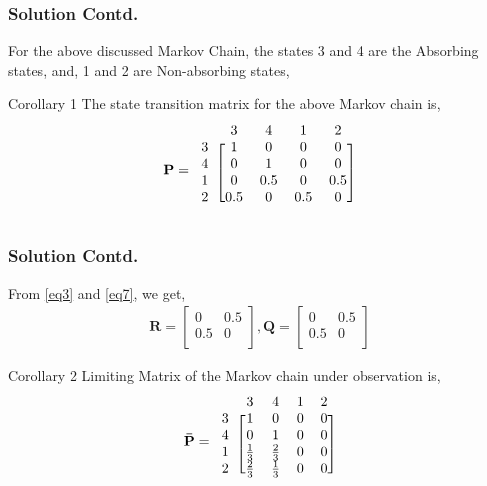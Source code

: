 \documentclass{beamer}
\renewcommand{\vec}[1]{\mathbf{#1}}
\let\vec\mathbf
\begin{document}
\begin{frame}
  \frametitle{Solution Contd.} 
  For the above discussed Markov Chain, the states 3 and 4 are the Absorbing states, and, 1 and 2 are Non-absorbing states, 
      \begin{block}{Corollary 1}
        The state transition matrix for the above Markov chain is, 
\begin{align}
    \vec{P}=\begin{blockarray}{cccccc}
& 3 & 4 & 1 & 2 \\
\begin{block}{c[ccccc]}
  3 & 1 & 0 & 0 & 0 \\
  4 & 0 & 1 & 0 & 0 \\
  1 & 0 & 0.5 & 0 & 0.5  \\
  2 & 0.5 & 0 & 0.5 & 0  \\
\end{block}
\end{blockarray}
\label{eq7}
\end{align} 
      \end{block}
\end{frame}

\begin{frame}
 \frametitle{Solution Contd.}
 From \eqref{eq3} and \eqref{eq7}, we get,
\begin{align}
    \vec{R}=\begin{bmatrix}
    0 & 0.5\\
    0.5 & 0\\
    \end{bmatrix},
    \vec{Q}=\begin{bmatrix}
    0 & 0.5 \\
    0.5 & 0 \\
    \end{bmatrix}
    \label{eq8}
\end{align}     
\begin{block}{Corollary 2}
  Limiting Matrix of the Markov chain under observation is, 
\begin{align} 
    \vec{\bar P}=\begin{blockarray}{ccccc}
&3 &4 &1 &2\\
\begin{block}{c[cccc]}
    3 & 1 & 0 & 0 & 0  \\
    4 & 0 & 1 & 0 & 0  \\
    1 & \frac{1}{3} & \frac{2}{3} & 0 & 0 \\
    2 & \frac{2}{3} & \frac{1}{3} & 0 & 0 \\
   \end{block}
\end{blockarray}
\label{eq9}
\end{align}
\end{block}
\end{frame}
\end{document}
